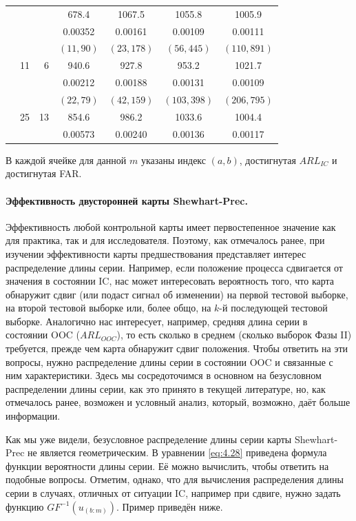 \begin{table}[!ht]
\begin{tabular}{@{}rrrcccc@{}}
		& & & 678.4 & 1067.5 & 1055.8 & 1005.9 \\
		& & & 0.00352 & 0.00161 & 0.00109 & 0.00111 \\
		& \multirow{3}{*}{11} & \multirow{3}{*}{6} & \((11,90)\) & \((23,178)\) & \((56,445)\) & \((110,891)\) \\
		& & & 940.6 & 927.8 & 953.2 & 1021.7 \\
		& & & 0.00212 & 0.00188 & 0.00131 & 0.00109 \\
		& \multirow{3}{*}{25} & \multirow{3}{*}{13} & \((22,79)\) & \((42,159)\) & \((103,398)\) & \((206,795)\) \\
		& & & 854.6 & 986.2 & 1033.6 & 1004.4 \\
		& & & 0.00573 & 0.00240 & 0.00136 & 0.00117 \\
		\bottomrule
	\end{tabular}
	\par\smallskip
	\footnotesize В каждой ячейке для данной \(m\) указаны индекс \((a,b)\), достигнутая \(ARL_{IC}\) и достигнутая FAR.
\end{table}

\paragraph{Эффективность двусторонней карты Shewhart-Prec.} Эффективность любой контрольной карты имеет первостепенное значение как для практика, так и для исследователя. Поэтому, как отмечалось ранее, при изучении эффективности карты предшествования представляет интерес распределение длины серии. Например, если положение процесса сдвигается от значения в состоянии IC, нас может интересовать вероятность того, что карта обнаружит сдвиг (или подаст сигнал об изменении) на первой тестовой выборке, на второй тестовой выборке или, более общо, на \(k\)-й последующей тестовой выборке. Аналогично нас интересует, например, средняя длина серии в состоянии OOC (\(ARL_{OOC}\)), то есть сколько в среднем (сколько выборок Фазы II) требуется, прежде чем карта обнаружит сдвиг положения. Чтобы ответить на эти вопросы, нужно распределение длины серии в состоянии OOC и связанные с ним характеристики. Здесь мы сосредоточимся в основном на безусловном распределении длины серии, как это принято в текущей литературе, но, как отмечалось ранее, возможен и условный анализ, который, возможно, даёт больше информации.

Как мы уже видели, безусловное распределение длины серии карты Shewhart-Prec не является геометрическим. В уравнении \eqref{eq:4.28} приведена формула функции вероятности длины серии. Её можно вычислить, чтобы ответить на подобные вопросы. Отметим, однако, что для вычисления распределения длины серии в случаях, отличных от ситуации IC, например при сдвиге, нужно задать функцию \(GF^{-1}\left( u_{(b:m)} \right)\). Пример приведён ниже.

